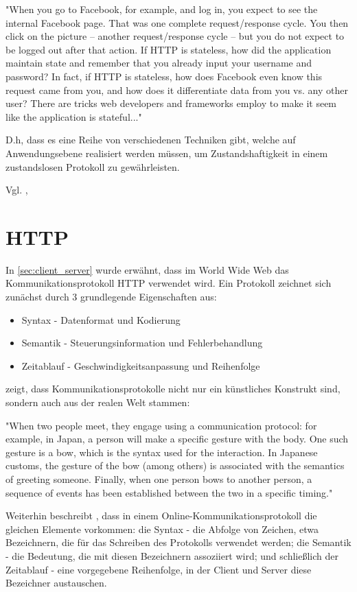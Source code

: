 "When you go to Facebook, for example, and log in, you expect to see the internal Facebook page. That was one complete request/response cycle. You then click on the picture -- another request/response cycle -- but you do not expect to be logged out after that action. If HTTP is stateless, how did the application maintain state and remember that you already input your username and password? In fact, if HTTP is stateless, how does Facebook even know this request came from you, and how does it differentiate data from you vs. any other user? There are tricks web developers and frameworks employ to make it seem like the application is stateful..."

D.h, dass es eine Reihe von verschiedenen Techniken gibt, welche auf Anwendungsebene realisiert werden müssen, um Zustandshaftigkeit in einem zustandslosen Protokoll zu gewährleisten.

Vgl. \citep[Background]{launchschool}, \citep{culloca}

\section{HTTP}

In \ref{sec:client_server} wurde erwähnt, dass im World Wide Web das Kommunikationsprotokoll HTTP verwendet wird. Ein Protokoll zeichnet sich zunächst durch 3 grundlegende Eigenschaften aus:

\begin{itemize}
\item Syntax - Datenformat und Kodierung
\item Semantik - Steuerungsinformation und Fehlerbehandlung
\item Zeitablauf - Geschwindigkeitsanpassung und Reihenfolge
\end{itemize}

\citep{dubost} zeigt, dass Kommunikationsprotokolle nicht nur ein künstliches Konstrukt sind, sondern auch aus der realen Welt stammen:

"When two people meet, they engage using a communication protocol: for example, in Japan, a person will make a specific gesture with the body. One such gesture is a bow, which is the syntax used for the interaction. In Japanese customs, the gesture of the bow (among others) is associated with the semantics of greeting someone. Finally, when one person bows to another person, a sequence of events has been established between the two in a specific timing."

Weiterhin beschreibt \citep{dubost}, dass in einem Online-Kommunikationsprotokoll die gleichen Elemente vorkommen: die Syntax - die Abfolge von Zeichen, etwa Bezeichnern, die für das Schreiben des Protokolls verwendet werden; die Semantik - die Bedeutung, die mit diesen Bezeichnern assoziiert wird; und schließlich der Zeitablauf - eine vorgegebene Reihenfolge, in der Client und Server diese Bezeichner austauschen.


